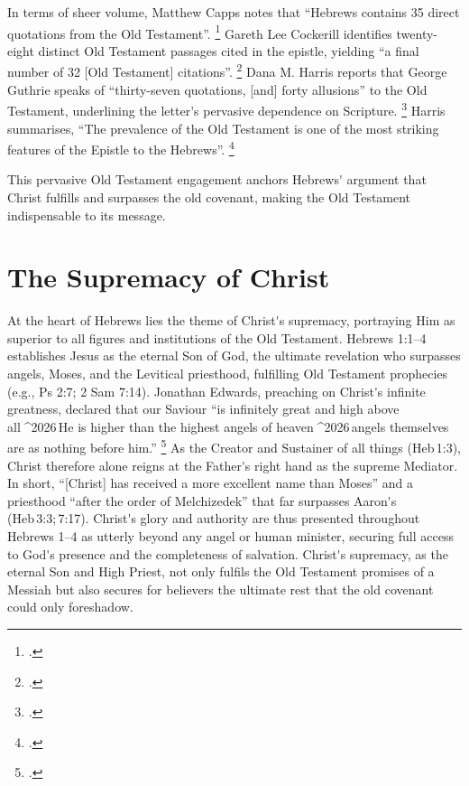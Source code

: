 \documentclass[12pt]{article}
\def\ellipis{^^^^2026}  %
\def\apos{^^27}         %
\def\jesus{Yeshua}
\def\christ{the Messiah}
\def\Christ{The Messiah}
\def\jesus{Jesus}
\def\christ{Christ}
\def\Christ{Christ}
\begin{document}
In terms of sheer volume, Matthew Capps notes that ``Hebrews contains 35 direct
quotations from the Old Testament''. \footcite[10]{Capps2015} Gareth Lee
Cockerill identifies twenty-eight distinct Old Testament passages cited in the
epistle, yielding ``a final number of 32 [Old Testament] citations''.
\footcite[14]{Cockerill2012} Dana M. Harris reports that George Guthrie speaks
of ``thirty-seven quotations, [and] forty allusions'' to the Old Testament,
underlining the letter\apos{}s pervasive dependence on Scripture.
\footcite[95]{Harris2021} Harris summarises, ``The prevalence of the Old
Testament is one of the most striking features of the Epistle to the Hebrews''.
\footcite[93]{Harris2021}

This pervasive Old Testament engagement anchors Hebrews\apos{} argument that
\christ{} fulfills and surpasses the old covenant, making the Old Testament
indispensable to its message.

\section{The Supremacy of \Christ{}} At the heart of Hebrews lies the theme of
\christ{}\apos{}s supremacy, portraying Him as superior to all figures and
institutions of the Old Testament.
%
Hebrews 1:1--4 establishes \jesus{} as the eternal Son of God, the ultimate
revelation who surpasses angels, Moses, and the Levitical priesthood, fulfilling
Old Testament prophecies (e.g., Ps 2:7; 2 Sam 7:14).
%
Jonathan Edwards, preaching on \christ{}\apos{}s infinite greatness, declared
that our Saviour ``is infinitely great and high above all\ellipis He is higher
than the highest angels of heaven\ellipis angels themselves are as nothing
before him.'' \footcite[103]{Edwards1981}
%
As the Creator and Sustainer of all things (Heb 1:3), \christ{} therefore alone
reigns at the Father\apos{}s right hand as the supreme Mediator.
%
In short, ``[\christ{}] has received a more excellent name than Moses'' and a
priesthood ``after the order of Melchizedek'' that far surpasses Aaron\apos{}s
(Heb 3:3; 7:17).
%
\Christ{}\apos{}s glory and authority are thus presented throughout Hebrews 1--4
as utterly beyond any angel or human minister, securing full access to
God\apos{}s presence and the completeness of salvation.
%
\Christ{}\apos{}s supremacy, as the eternal Son and High Priest, not only
fulfils the Old Testament promises of a Messiah but also secures for believers
the ultimate rest that the old covenant could only foreshadow.
\end{document}
